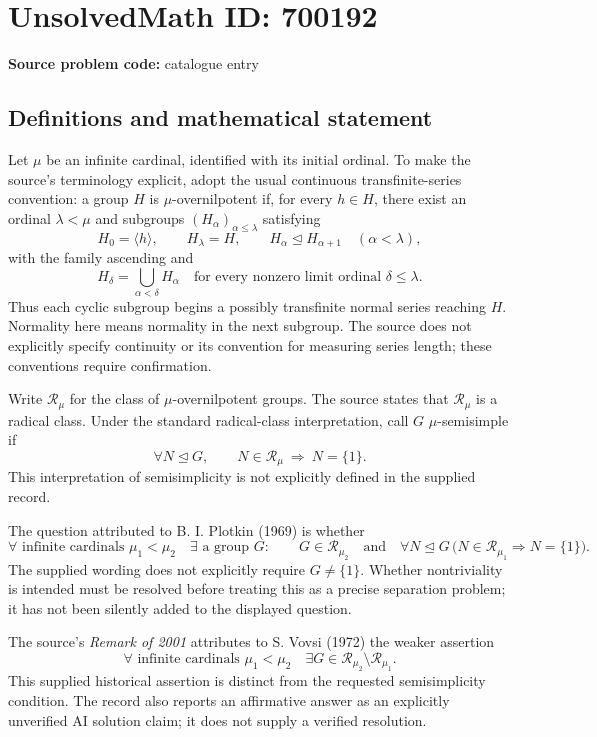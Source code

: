 \documentclass[11pt]{article}
\begin{document}
\section*{UnsolvedMath ID: 700192}
\textbf{Source problem code:} catalogue entry
\subsection{Definitions and mathematical statement}
Let \(\mu\) be an infinite cardinal, identified with its initial ordinal. To make the source's terminology explicit, adopt the usual continuous transfinite-series convention: a group \(H\) is \(\mu\)-overnilpotent if, for every \(h\in H\), there exist an ordinal \(\lambda<\mu\) and subgroups \((H_\alpha)_{\alpha\leq\lambda}\) satisfying
\[
H_0=\langle h\rangle,\qquad H_\lambda=H,\qquad
H_\alpha\trianglelefteq H_{\alpha+1}\quad(\alpha<\lambda),
\]
with the family ascending and
\[
H_\delta=\bigcup_{\alpha<\delta}H_\alpha
\quad\text{for every nonzero limit ordinal }\delta\leq\lambda.
\]
Thus each cyclic subgroup begins a possibly transfinite normal series reaching \(H\). Normality here means normality in the next subgroup. The source does not explicitly specify continuity or its convention for measuring series length; these conventions require confirmation.

Write \(\mathcal R_\mu\) for the class of \(\mu\)-overnilpotent groups. The source states that \(\mathcal R_\mu\) is a radical class. Under the standard radical-class interpretation, call \(G\) \(\mu\)-semisimple if
\[
\forall N\trianglelefteq G,\qquad
N\in\mathcal R_\mu\ \Longrightarrow\ N=\{1\}.
\]
This interpretation of semisimplicity is not explicitly defined in the supplied record.

The question attributed to B. I. Plotkin (1969) is whether
\[
\forall\text{ infinite cardinals }\mu_1<\mu_2\quad
\exists\text{ a group }G:\qquad
G\in\mathcal R_{\mu_2}
\quad\text{and}\quad
\forall N\trianglelefteq G\,
\bigl(N\in\mathcal R_{\mu_1}\Longrightarrow N=\{1\}\bigr).
\]
The supplied wording does not explicitly require \(G\neq\{1\}\). Whether nontriviality is intended must be resolved before treating this as a precise separation problem; it has not been silently added to the displayed question.

The source's \emph{Remark of 2001} attributes to S. Vovsi (1972) the weaker assertion
\[
\forall\text{ infinite cardinals }\mu_1<\mu_2\quad
\exists G\in\mathcal R_{\mu_2}\setminus\mathcal R_{\mu_1}.
\]
This supplied historical assertion is distinct from the requested semisimplicity condition. The record also reports an affirmative answer as an explicitly unverified AI solution claim; it does not supply a verified resolution.
\end{document}
